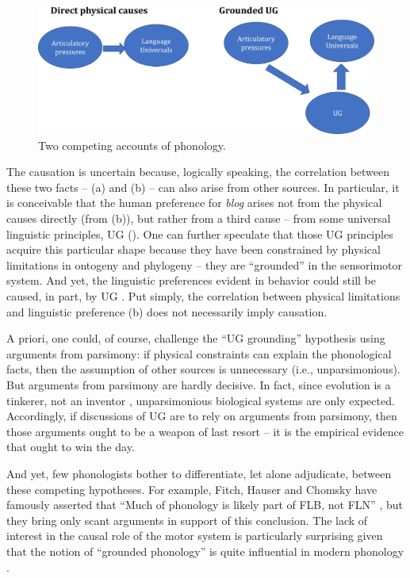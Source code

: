 \documentclass[output=paper,colorlinks,citecolor=brown
]{langscibook}
\begin{document}
\begin{figure}
    \centering
    \includegraphics[width=\textwidth,keepaspectratio]{figures/berent_figure4.jpg}
    \caption{Two competing accounts of phonology.}
    \label{fig:figure4}
\end{figure}

\begin{sloppypar}
The causation is uncertain because, logically speaking, the correlation between these two facts -- (a) and (b) -- can also arise from other sources. In particular, it is conceivable that the human preference for \textit{blog} arises not from the physical causes directly (from (b)), but rather from a third cause -- from some universal linguistic principles, UG (). One can further speculate that those UG principles acquire this particular shape because they have been constrained by physical limitations in ontogeny and phylogeny -- they are “grounded” in the sensorimotor system. And yet, the linguistic preferences evident in behavior could still be caused, in part, by UG \citep{berent2013phonologicala}. Put simply, the correlation between physical limitations and linguistic preference (b) does not necessarily imply causation.
\end{sloppypar}

A priori, one could, of course, challenge the “UG grounding” hypothesis using arguments from parsimony: if physical constraints can explain the phonological facts, then the assumption of other sources is unnecessary (i.e., unparsimonious). But arguments from parsimony are hardly decisive. In fact, since evolution is a tinkerer, not an inventor \citep{jacob1977evolution}, unparsimonious biological systems are only expected. Accordingly, if discussions of UG are to rely on arguments from parsimony, then those arguments ought to be a weapon of last resort -- it is the empirical evidence that ought to win the day. 

And yet, few phonologists bother to differentiate, let alone adjudicate, between these competing hypotheses. For example, Fitch, Hauser and Chomsky have famously asserted that “Much of phonology is likely part of FLB, not FLN” \citep{fitch2005evolution}, but they bring only scant arguments in support of this conclusion. The lack of interest in the causal role of the motor system is particularly surprising given that the notion of “grounded phonology” is quite influential in modern phonology \citep{archangeli1994grounded,hayes2004phonetically}.
\end{document}
